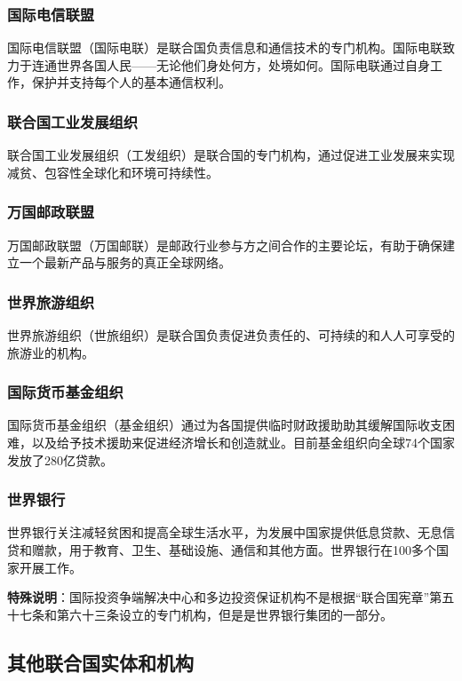 \documentclass[a4paper,openany]{book}
\begin{document}
\subsubsection{国际电信联盟}
国际电信联盟（国际电联）是联合国负责信息和通信技术的专门机构。国际电联致力于连通世界各国人民——无论他们身处何方，处境如何。国际电联通过自身工作，保护并支持每个人的基本通信权利。

\subsubsection{联合国工业发展组织}
联合国工业发展组织（工发组织）是联合国的专门机构，通过促进工业发展来实现减贫、包容性全球化和环境可持续性。

\subsubsection{万国邮政联盟}
万国邮政联盟（万国邮联）是邮政行业参与方之间合作的主要论坛，有助于确保建立一个最新产品与服务的真正全球网络。

\subsubsection{世界旅游组织}
世界旅游组织（世旅组织）是联合国负责促进负责任的、可持续的和人人可享受的旅游业的机构。

\subsubsection{国际货币基金组织}
国际货币基金组织（基金组织）通过为各国提供临时财政援助助其缓解国际收支困难，以及给予技术援助来促进经济增长和创造就业。目前基金组织向全球74个国家发放了280亿贷款。

\subsubsection{世界银行}
世界银行关注减轻贫困和提高全球生活水平，为发展中国家提供低息贷款、无息信贷和赠款，用于教育、卫生、基础设施、通信和其他方面。世界银行在100多个国家开展工作。

\textbf{特殊说明}：国际投资争端解决中心和多边投资保证机构不是根据“联合国宪章”第五十七条和第六十三条设立的专门机构，但是是世界银行集团的一部分。

\subsection{其他联合国实体和机构}
\end{document}
